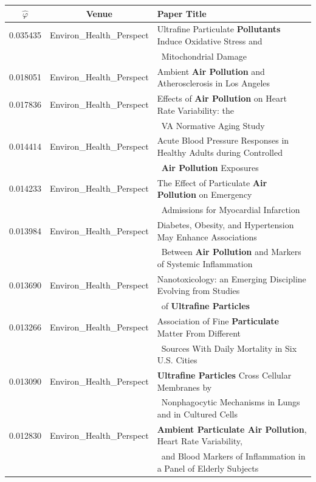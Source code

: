 \begin{table}[t!]
\begin{tabular}{|c|c|l|}
\hline
$\hat\varphi$	&	Venue	&	Paper Title \\
\hline\hline
0.035435 & Environ\_Health\_Perspect & Ultrafine Particulate \textbf{Pollutants}
Induce Oxidative Stress and  \\
&& \, Mitochondrial Damage \\
0.018051 & Environ\_Health\_Perspect & Ambient \textbf{Air Pollution} and
Atherosclerosis in Los Angeles \\
0.017836 & Environ\_Health\_Perspect & Effects of \textbf{Air Pollution} on
Heart Rate Variability: the \\
&& \, VA Normative Aging Study \\
0.014414 & Environ\_Health\_Perspect & Acute Blood Pressure Responses in Healthy
Adults during Controlled \\
&& \, \textbf{Air Pollution} Exposures \\
0.014233 & Environ\_Health\_Perspect	& The Effect of Particulate \textbf{Air
Pollution} on Emergency \\
&& \, Admissions for Myocardial Infarction\\
0.013984 & Environ\_Health\_Perspect & Diabetes, Obesity, and Hypertension May
Enhance Associations \\
&& \, Between \textbf{Air Pollution} and Markers of Systemic Inflammation \\
0.013690 & Environ\_Health\_Perspect & Nanotoxicology: an Emerging Discipline
Evolving from Studies \\
&& \, of \textbf{Ultrafine Particles} \\
0.013266 & Environ\_Health\_Perspect & Association of Fine \textbf{Particulate}
Matter From Different \\
&& \, Sources With Daily Mortality in Six U.S. Cities \\
0.013090 & Environ\_Health\_Perspect & \textbf{Ultrafine Particles} Cross
Cellular Membranes by  \\
&& \, Nonphagocytic Mechanisms in Lungs and in Cultured Cells \\
0.012830 & Environ\_Health\_Perspect	& \textbf{Ambient Particulate Air
Pollution}, Heart Rate Variability, \\
&& \, and Blood Markers of Inflammation in a Panel of Elderly
  Subjects \\
\hline
\hline %
\end{tabular}
\end{table}

